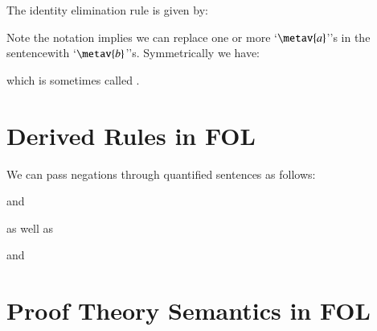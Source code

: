 \documentclass[12pt, a4paper, oneside, openright, titlepage]{book}
\begin{document}
\begin{defn}
    The identity elimination rule is given by:\begin{fitchproof}
         
    \end{fitchproof}
    Note the notation implies we can replace one or more `$\metav{a}$''s in the sentencewith `$\metav{b}$''s. Symmetrically we have:\begin{fitchproof}
         
    \end{fitchproof}
    which is sometimes called .
\end{defn}


\section{\textsection Derived Rules in FOL}

\begin{defn}
    We can pass negations through quantified sentences as follows:
    \begin{fitchproof}
         
    \end{fitchproof}
    and \begin{fitchproof}
         
    \end{fitchproof}
    as well as \begin{fitchproof}
         
    \end{fitchproof}
    and \begin{fitchproof}
         
    \end{fitchproof}
\end{defn}



\section{\textsection Proof Theory Semantics in FOL}
\end{document}
